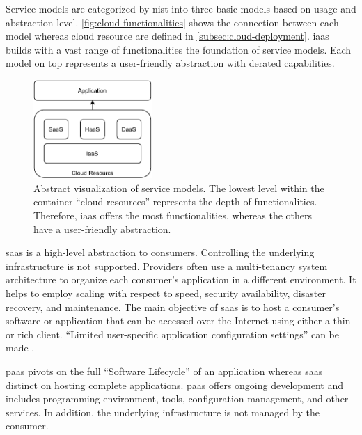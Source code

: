 Service models are categorized by \ac{nist} into three basic models based on usage and abstraction level.
\autoref{fig:cloud-functionalities} shows the connection between each model whereas cloud resource are defined in \autoref{subsec:cloud-deployment}.
\ac*{iaas} builds with a vast range of functionalities the foundation of service models.
Each model on top represents a user-friendly abstraction with derated capabilities.

\begin{figure}[ht]
    \centering
    \includegraphics[width=0.4\textwidth]{figures/cloud-service-models.pdf}
    \caption[Abstract visualization of service models]{
        Abstract visualization of service models.
        The lowest level within the container \enquote{cloud resources} represents the depth of functionalities.
        Therefore, \ac{iaas} offers the most functionalities, whereas the others have a user-friendly abstraction.
    }
    \label{fig:cloud-functionalities}
\end{figure}

\ac{saas} is a high-level abstraction to consumers.
Controlling the underlying infrastructure is not supported.
Providers often use a multi-tenancy system architecture to organize each consumer's application in a different environment.
It helps to employ scaling with respect to speed, security availability, disaster recovery, and maintenance.
The main objective of \ac{saas} is to host a consumer's software or application that can be accessed over the Internet using either a thin or rich client. \cite{Dillon2010}
\enquote{Limited user-specific application configuration settings} can be made \cite{Mell2011}.

\ac{paas} pivots on the full \enquote{Software Lifecycle} of an application whereas \ac{saas} distinct on hosting complete applications.
\ac{paas} offers ongoing development and includes programming environment, tools, configuration management, and other services.
In addition, the underlying infrastructure is not managed by the consumer. \cite{Mell2011}

